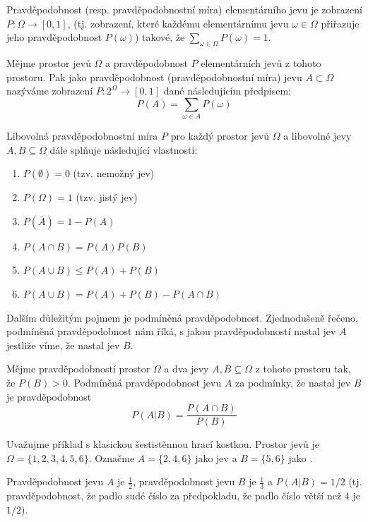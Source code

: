 \documentclass[a4paper,10pt]{article}
\begin{document}
\begin{definition}
 Pravděpodobnost (resp. pravděpodobnostní míra) elementárního jevu je zobrazení $P: \Omega \rightarrow [0,1]$, (tj. zobrazení, které každému elementárnímu jevu $\omega \in \Omega$ přiřazuje jeho pravděpodobnost $P(\omega)$) takové, že $\sum_{\omega \in \Omega} P(\omega) = 1$.
\end{definition}

\begin{definition}
 Mějme prostor jevů $\Omega$ a pravděpodobnost $P$ elementárních jevů z tohoto prostoru. Pak jako pravděpodobnost (pravděpodobnostní míra) jevu $A \subset \Omega$ nazýváme zobrazení $P: 2^\Omega \rightarrow [0,1]$ dané následujícím předpisem:
  $$
    P(A) = \sum_{\omega \in A} P(\omega)
  $$
\end{definition}

Libovolná pravděpodobnostní míra $P$ pro každý prostor jevů $\Omega$ a libovolné jevy $A, B \subseteq \Omega$ dále splňuje následující vlastnosti:
\begin{enumerate}
 \item $P(\emptyset) = 0$ (tzv. nemožný jev)
 \item $P(\Omega) = 1$ (tzv. jistý jev)
 \item $P(\overline{A}) = 1 - P(A)$
 \item $P(A \cap B) = P(A) P(B)$
 \item $P(A \cup B) \leq P(A) + P(B)$
 \item $P(A \cup B) = P(A) + P(B) - P(A \cap B)$
\end{enumerate}

Dalším důležitým pojmem je podmíněná pravděpodobnost. Zjednodušeně řečeno, podmíněná pravděpodobnost nám říká, s jakou pravděpodobností nastal jev $A$ jestliže víme, že nastal jev $B$.

\begin{definition}
 Mějme pravděpodobností prostor $\Omega$ a dva jevy $A, B \subseteq \Omega$ z tohoto prostoru tak, že $P(B) > 0$. Podmíněná pravděpodobnost jevu $A$ za podmínky, že nastal jev $B$ je pravděpodobnost 
 $$
  P(A | B) = \frac{P(A \cap B)}{P(B)}
 $$
\end{definition}

\begin{example}
 Uvažujme příklad s klasickou šestistěnnou hrací kostkou. Prostor jevů je $\Omega = \{ 1,2,3,4,5,6 \}$. Označme $A = \{2, 4, 6\}$ jako jev  a $B = \{ 5, 6 \}$ jako .
 
 Pravděpodobnost jevu $A$ je $\frac{1}{2}$, pravděpodobnost jevu $B$ je $\frac{1}{3}$ a $P(A | B) = 1 / 2$ (tj. pravděpodobnost, že padlo sudé číslo za předpokladu, že padlo číslo větší než $4$ je $1/2$).
\end{example}
\end{document}
